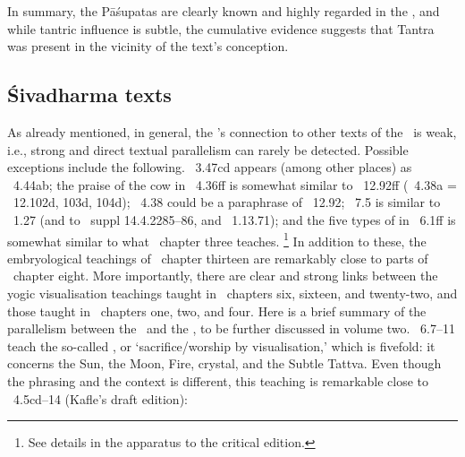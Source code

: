 In summary, the Pāśupatas are clearly known and highly regarded in the \VSS, 
and while tantric influence is subtle, the cumulative evidence suggests
that Tantra was present in the vicinity of the text's conception. 


\subsection{Śivadharma texts}
\label{vss_connection_other_sd_texts}

As already mentioned, in general, the \VSS's connection to other texts of 
the \Sivadharmacorpus\ is weak, i.e., strong and direct textual parallelism can rarely be detected.
Possible exceptions include the following.
\VSS\ 3.47cd appears (among other places) as \SDHU\ 4.44ab;
the praise of the cow in \VSS\ 4.36ff is somewhat similar to \SDHU\ 12.92ff (\VSS\ 4.38a = \SDHU\ 12.102d, 103d, 104d);
\VSS\ 4.38 could be a paraphrase of \SDHU\ 12.92; 
\VSS\ 7.5 is similar to \SDHU\ 1.27 (and to \MBH\ suppl 14.4.2285--86, and \NaradaP\ 1.13.71);
and the five types of  in \VSS\ 6.1ff is somewhat similar to what \SDHU\ chapter three teaches.%
                \footnote{See details in the apparatus to the critical edition.}
In addition to these, the embryological teachings of \VSS\ chapter thirteen are
remarkably close to parts of \SDHU\ chapter eight.
More importantly, there are clear and strong links between the yogic visualisation teachings
taught in \VSS\ chapters six, sixteen, and twenty-two, and those taught in \DharmP\ chapters one, two, and four.
\label{dharmaputrika}
Here is a brief summary of the parallelism between the \VSS\ and the \DharmP, 
to be further discussed in volume two.
\VSS\ 6.7--11 teach the so-called ,\label{dhyanayajna}
or `sacrifice/worship by visualisation,' which is fivefold: it concerns
the Sun, the Moon, Fire, crystal, and the Subtle Tattva.
Even though the phrasing and the context is different, 
this teaching is remarkable close to \DharmP\ 4.5cd--14 (Kafle's draft edition):

